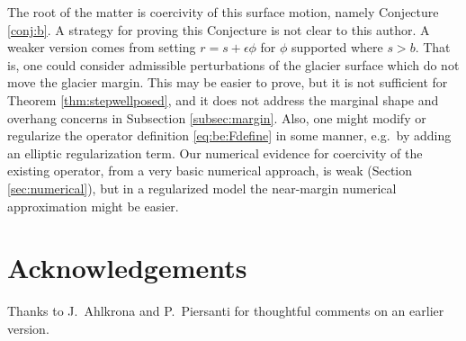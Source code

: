 \documentclass[hidelinks,onefignum,onetabnum,final]{siamart220329}  %
\newcommand{\eps}{\epsilon}
\begin{document}
The root of the matter is coercivity of this surface motion, namely Conjecture \ref{conj:b}.  A strategy for proving this Conjecture is not clear to this author.  A weaker version comes from setting $r=s + \eps\phi$ for $\phi$ supported where $s>b$.  That is, one could consider admissible perturbations of the glacier surface which do not move the glacier margin.  This may be easier to prove, but it is not sufficient for Theorem \ref{thm:stepwellposed}, and it does not address the marginal shape and overhang concerns in Subsection \ref{subsec:margin}.  Also, one might modify or regularize the operator definition \eqref{eq:be:Fdefine} in some manner, e.g.~by adding an elliptic regularization term.  Our numerical evidence for coercivity of the existing operator, from a very basic numerical approach, is weak (Section \ref{sec:numerical}), but in a regularized model the near-margin numerical approximation might be easier.


\section{Acknowledgements} \label{sec:acknowledgements}

Thanks to J.~Ahlkrona and P.~Piersanti for thoughtful comments on an earlier version.



\end{document}
